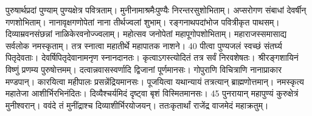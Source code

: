 पुरुषार्थप्रदां पुण्याम् पुण्यक्षेत्र पवित्रताम्।
 मुनीनामाश्रमैःपुण्यैः निरन्तरसुशोभिताम्।
 अप्सरोगण संबाधां देवर्षीन् गणशोभिताम्।
 नानावृक्षगणोपेतां नाना तीर्थज्वलां शुभाम्।
 रङ्गनाथपदांभोज पवित्रीकृत पाथसम्।
 दिव्याम्रवनसंछन्नां नाळिकेरवनोज्ज्वलाम्।
 महोत्सव जनोपेतां महापूगोपशोभिताम्।
 महाराजस्समासाद्य सर्वलोक नमस्कृताम्।
 तत्र स्नात्वा महातीर्थे महापातक नाशने।
 40 पीत्वा पुण्यजलं स्वच्छं संतर्घ्य पितृदेवताः।
 देवर्षिपितृदेवानामनृण स्नानदानतः।
 कृत्वाऽगस्त्योदितं तत्र सर्वं निरवशेषतः।
 श्रीरङ्गशायिनं विष्णुं प्रणम्य पुरुषोत्तमम्।
 दत्वान्नवासस्वर्णादि द्विजानां पूर्णमानसः।
 गोपुराणि विचित्राणि नानाप्राकार मण्डपान्।
 कारयित्वा महीपालः प्रसन्नेंद्रियमानसः।
 पूजयित्वा यथान्यायं तत्रत्यान् ब्राह्मणोत्तमान्।
 नमस्कृत्य महातेजा आशीर्भिरभिनंदितः।
 दिव्यैश्चर्यमिदं दृष्ट्वा बृशं विस्मितमानसः।
 45 पुनरायान् महापुण्यं कुरुक्षेत्रं मुनीश्वरान्।
 ववंदे तं मुनींद्राश्च दिव्याशीर्भिरयोजयन्।
 ततःकृतार्थां राजेंद्र वाजमेदं महाक्रतुम्।
 
